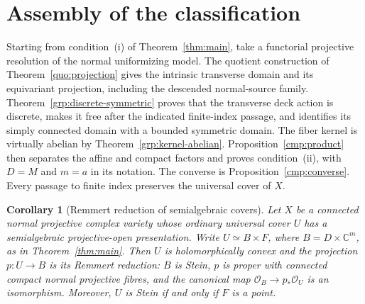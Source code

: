 \documentclass[11pt]{article}
\newtheorem{corollary}[theorem]{Corollary}
\theoremstyle{definition}
\theoremstyle{remark}
\newcommand{\C}{\mathbb C}
\begin{document}







\section{Assembly of the classification}\label{sec:assembly}
Starting from condition~\textup{(i)} of Theorem~\ref{thm:main}, take a
functorial projective resolution of the normal uniformizing model.
The quotient construction of Theorem~\ref{quo:projection} gives the
intrinsic transverse domain and its equivariant projection, including
the descended normal-source family. Theorem~\ref{grp:discrete-symmetric}
proves that the transverse deck action is discrete, makes it free
after the indicated finite-index passage, and identifies its simply
connected domain with a bounded symmetric domain. The fiber kernel is virtually abelian by
Theorem~\ref{grp:kernel-abelian}. Proposition~\ref{cmp:product} then separates
the affine and compact factors and proves condition~\textup{(ii)},
with \(D=M\) and \(m=a\) in its notation.
The converse is Proposition~\ref{cmp:converse}.
Every passage to finite index preserves the universal cover of \(X\).

\begin{corollary}[Remmert reduction of semialgebraic covers]
\label{cor:remmert-semialgebraic}
Let \(X\) be a connected normal projective complex variety whose ordinary
universal cover \(U\) has a semialgebraic projective-open presentation.
Write \(U\simeq B\times F\), where \(B=D\times\C^m\), as in
Theorem~\ref{thm:main}. Then \(U\) is holomorphically convex and the
projection \(p:U\to B\) is its Remmert reduction: \(B\) is Stein,
\(p\) is proper with connected compact normal projective fibres, and
the canonical map \(\mathcal O_B\to p_*\mathcal O_U\) is an isomorphism.
Moreover, \(U\) is Stein if and only if \(F\) is a point.
\end{corollary}
\end{document}
